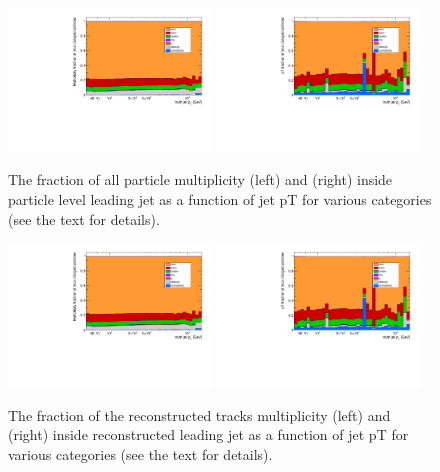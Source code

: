 \begin{figure}
	\centering
	\includegraphics[width=0.48\textwidth,page=3]{figures/jet_comp_study_powheg_Tight_MultiplicityFraction.pdf}
	\includegraphics[width=0.48\textwidth,page=3]{figures/jet_comp_study_powheg_Tight_pTFraction.pdf}
	\caption {The fraction of all particle multiplicity (left) and \pT (right) inside particle level leading jet as a function of jet pT for various categories (see the text for details).}
	\label{fig:truthJetComp}
\end{figure}


\begin{figure}
\centering
\includegraphics[width=0.48\textwidth,page=1]{figures/jet_comp_study_powheg_Tight_MultiplicityFraction.pdf}
\includegraphics[width=0.48\textwidth,page=1]{figures/jet_comp_study_powheg_Tight_pTFraction.pdf}
\caption {The fraction of the reconstructed tracks multiplicity (left) and \pT (right) inside reconstructed leading jet as a function of jet pT for various categories (see the text for details).}
\label{fig:fraction of charged particles in reco jet}
\end{figure}


